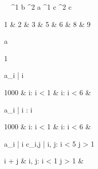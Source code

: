 \begin{eqcode}{\mu}{\ }{\ }{^1}
  b ^2 \lend
  a \in {}^1 \lend
  c \in {}^2 \lend
  c \gets \begin{tmatrix}
    1 & 2 & 3  & 5 & 6  & 8 & 9 \lend
  \end{tmatrix} \lend
  a \gets 
  \begin{tmatrix}
    1   \lend
  \end{tmatrix} \lend
  a_i | \forall i \gets 
  \begin{cases}
    1000 & i: i < 1  & i: i < 6  & \otherwise \lend
  \end{cases}\lend

  a_i | i : i  \gets
  \begin{cases}
    1000 & i: i < 1  & i: i < 6  & \otherwise \lend
  \end{cases}\lend

  a_i | \forall i  \lend
  c_{i,j} | i, j: i < 5 \cap j > 1 \gets 
  \begin{cases}
    i + j & i, j: i < 1 \cap j > 1  & \otherwise \lend
  \end{cases} \lend
   \lend
\end{eqcode}

